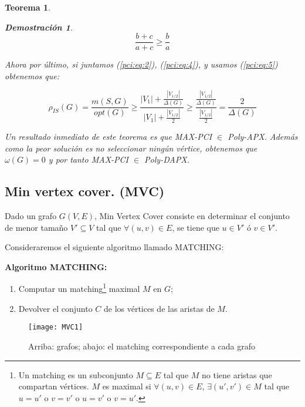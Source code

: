 \documentclass[a4paper,12pt,titlepage]{article}
\newtheorem{teo}{Teorema}[section]
\newtheorem*{dem}{\textbf{Demostraci\'on}}
\begin{document}
\begin{teo}
\begin{dem}
\begin{equation} \label{pci:eq:5}
\frac{b + c}{a + c} \geq \frac{b}{a}
\end{equation}

Ahora por \'ultimo, si juntamos (\ref{pci:eq:2}), (\ref{pci:eq:4}), y usamos (\ref{pci:eq:5}) obtenemos que:

\begin{equation} \label{pci:eq:6}
\rho_{IS}(G) = \frac{m(S,G)}{opt(G)} \geq \frac{|V_1| + \frac{|V_{1/2}|}{\Delta(G)}}{|V_1| + \frac{|V_{1/2}|}{2}} \geq \frac{\frac{|V_{1/2}|}{\Delta(G)}}{\frac{|V_{1/2}|}{2}} = \frac{2}{\Delta(G)}
\end{equation}

\end{dem}

Un resultado inmediato de este teorema es que MAX-PCI $\in$ Poly-APX. Adem\'as como la peor soluci\'on es no seleccionar ning\'un v\'ertice, obtenemos que $\omega(G) = 0$ y por tanto MAX-PCI $\in$ Poly-DAPX.

\end{teo}

\subsection{Min vertex cover. (MVC)}

Dado un grafo $G(V,E)$, Min Vertex Cover consiste en determinar el conjunto de menor tamaño $V' \subseteq V$ tal que $\forall (u,v)\in E$, se tiene que $u \in V'$ \'o $v \in V'$.

Consideraremos el siguiente algoritmo llamado MATCHING:

\vspace{0.3cm}

\textbf{Algoritmo MATCHING:}

\begin{enumerate}
\item Computar un matching\footnote{Un matching es un subconjunto $ M \subseteq E$ tal que $M$ no tiene aristas que compartan v\'ertices. $M$ es maximal si $\forall (u,v)\in E$, $\exists(u',v')\in M$ tal que $u=u'$ o $v=v'$ o $u=v'$ o $v=u'$.} maximal $M$ en $G$;
\item Devolver el conjunto $C$ de los v\'ertices de las aristas de $M$.
\end{enumerate}

\begin{figure}[h]
\centering
\texttt{[image: MVC1]}
\caption{Arriba: grafos; abajo: el matching correspondiente a cada grafo}
\label{mvc:fig:1}
\end{figure}
\end{document}
